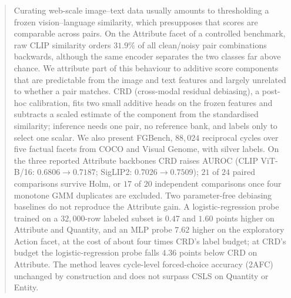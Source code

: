 \begin{abstract}
Curating web-scale image--text data usually amounts to thresholding a frozen
vision--language similarity, which presupposes that scores are comparable across
pairs. On the Attribute facet of a controlled benchmark, raw CLIP similarity orders
$31.9\%$ of all clean/noisy pair combinations backwards, although the same encoder
separates the two classes far above chance. We attribute part of this behaviour to
additive score components that are predictable from the image and text features and
largely unrelated to whether a pair matches. CRD (cross-modal residual debiasing),
a post-hoc calibration, fits two small additive heads on the frozen features and
subtracts a scaled estimate of the component from the standardised similarity; inference needs
one pair, no reference bank, and labels only to select one scalar. We also present
FGBench, $88{,}024$ reciprocal cycles over five factual facets from COCO and Visual
Genome, with silver labels. On the three reported Attribute backbones CRD raises
AUROC (CLIP ViT-B/16: $0.6806\to0.7187$; SigLIP2: $0.7026\to0.7509$); $21$ of $24$
paired comparisons survive Holm, or $17$ of $20$ independent comparisons once four
monotone GMM duplicates are excluded. Two parameter-free debiasing baselines do not
reproduce the Attribute gain. A logistic-regression probe trained on a
$32{,}000$-row labeled subset is $0.47$ and $1.60$ points higher on Attribute and
Quantity, and an MLP probe $7.62$ higher on the exploratory Action facet, at the cost
of about four times CRD's label budget; at CRD's budget the logistic-regression probe
falls $4.36$ points below CRD on Attribute. The method leaves cycle-level forced-choice
accuracy (2AFC) unchanged by construction and does not surpass CSLS on Quantity or
Entity.
\end{abstract}

